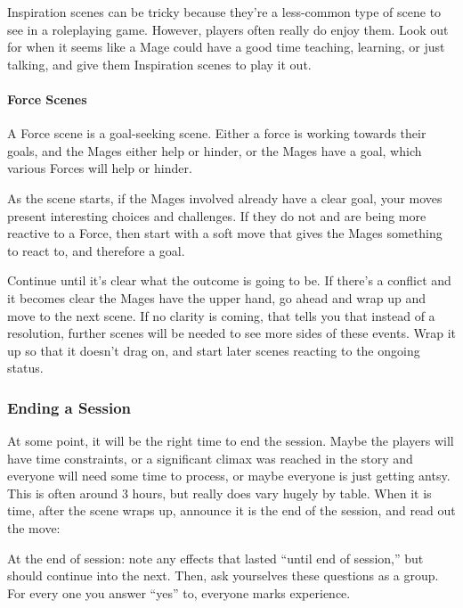 \documentclass[
]{article}
\begin{document}
Inspiration scenes can be tricky because they're a less-common type of
scene to see in a roleplaying game. However, players often really do
enjoy them. Look out for when it seems like a Mage could have a good
time teaching, learning, or just talking, and give them Inspiration
scenes to play it out.

\hypertarget{force-scenes}{%
\paragraph{Force Scenes}\label{force-scenes}}

A Force scene is a goal-seeking scene. Either a force is working towards
their goals, and the Mages either help or hinder, or the Mages have a
goal, which various Forces will help or hinder.

As the scene starts, if the Mages involved already have a clear goal,
your moves present interesting choices and challenges. If they do not
and are being more reactive to a Force, then start with a soft move that
gives the Mages something to react to, and therefore a goal.

Continue until it's clear what the outcome is going to be. If there's a
conflict and it becomes clear the Mages have the upper hand, go ahead
and wrap up and move to the next scene. If no clarity is coming, that
tells you that instead of a resolution, further scenes will be needed to
see more sides of these events. Wrap it up so that it doesn't drag on,
and start later scenes reacting to the ongoing status.

\hypertarget{ending-a-session}{%
\subsubsection{Ending a Session}\label{ending-a-session}}

At some point, it will be the right time to end the session. Maybe the
players will have time constraints, or a significant climax was reached
in the story and everyone will need some time to process, or maybe
everyone is just getting antsy. This is often around 3 hours, but really
does vary hugely by table. When it is time, after the scene wraps up,
announce it is the end of the session, and read out the move:

At the end of session: note any effects that lasted ``until end of
session,'' but should continue into the next. Then, ask yourselves these
questions as a group. For every one you answer ``yes'' to, everyone
marks experience.
\end{document}
